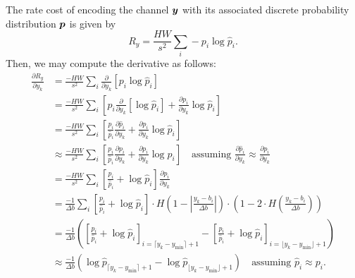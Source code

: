 The rate cost of encoding the channel ${\boldsymbol{y}}$ with its associated discrete probability distribution ${\boldsymbol{p}}$ is given by
%
\begin{equation*}
  R_y = \frac{H W}{s^2} \sum_i -p_i \log \hat{p}_i.
\end{equation*}
%
Then, we may compute the derivative as follows:
%
\begin{equation}
  \label{eq:pdf_compression/optimization/dRdy_proposed}
  \begin{split}
    \frac{\partial R_y}{\partial y_k}
    &= \frac{-H W}{s^2} \sum_i \frac{\partial}{\partial y_k} \left[ p_i \log \hat{p}_i \right]
    \\
    &= \frac{-H W}{s^2} \sum_i \left[
      p_i \frac{\partial}{\partial y_k} \left[ \log \hat{p}_i \right]
      + \frac{\partial p_i}{\partial y_k} \log \hat{p}_i
    \right]
    \\
    &= \frac{-H W}{s^2} \sum_i \left[
      \frac{p_i}{\hat{p}_i} \frac{\partial \hat{p}_i}{\partial y_k}
      + \frac{\partial p_i}{\partial y_k} \log \hat{p}_i
    \right]
    \\
    &\approx \frac{-H W}{s^2} \sum_i \left[
      \frac{p_i}{\hat{p}_i} \frac{\partial p_i}{\partial y_k}
      + \frac{\partial p_i}{\partial y_k} \log \hat{p}_i
    \right]
    \quad \text{assuming } \frac{\partial \hat{p}_i}{\partial y_k} \approx \frac{\partial p_i}{\partial y_k}
    \\
    &= \frac{-H W}{s^2} \sum_i
      \left[ \frac{p_i}{\hat{p}_i} + \log \hat{p}_i \right]
      \frac{\partial p_i}{\partial y_k}
    \\
    &= \frac{-1}{\Delta b} \sum_i
      \left[ \frac{p_i}{\hat{p}_i} + \log \hat{p}_i \right] \cdot
      H{\left( 1 - \left| \frac{y_k - b_i}{\Delta b} \right| \right)} \cdot
      \left( 1 - 2 \cdot H{\left( \frac{y_k - b_i}{\Delta b} \right)} \right)
    \\
    &= \frac{-1}{\Delta b}
      \left(
        \left[ {\frac{p_i}{\hat{p}_i} + \log \hat{p}_i} \right]_{
          i=\lceil{y_k - y_{\mathrm{min}}}\rceil + 1
        }
        -
        \left[ {\frac{p_i}{\hat{p}_i} + \log \hat{p}_i} \right]_{
          i=\lfloor{y_k - y_{\mathrm{min}}}\rfloor + 1
        }
      \right)
    \\
    &\approx \frac{-1}{\Delta b} \left(
      \log \hat{p}_{\lceil{y_k - y_{\mathrm{min}}}\rceil + 1} -
      \log \hat{p}_{\lfloor{y_k - y_{\mathrm{min}}}\rfloor + 1}
    \right)
    \quad \text{assuming } \hat{p}_i \approx p_i.
  \end{split}
\end{equation}
